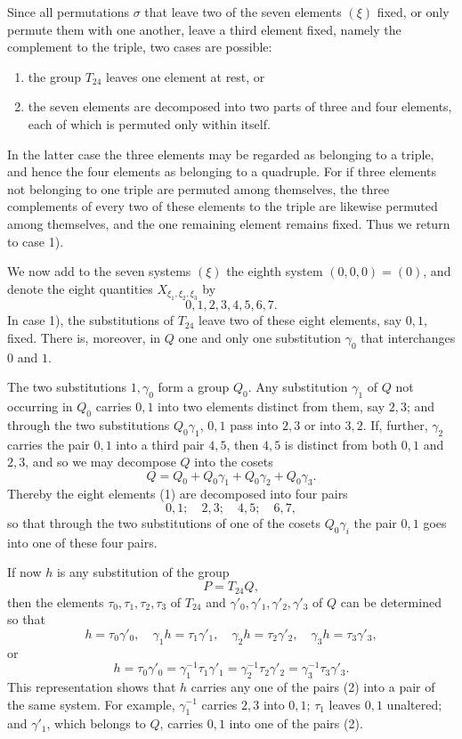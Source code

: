 \documentclass[11pt]{article}
\begin{document}
Since all permutations $\sigma$ that leave two of the seven elements $(\xi)$ fixed, or only permute them with one another, leave a third element fixed, namely the complement to the triple, two cases are possible:
\begin{enumerate}[label=\arabic*),leftmargin=2.8em]
\item the group $T_{24}$ leaves one element at rest, or
\item the seven elements are decomposed into two parts of three and four elements, each of which is permuted only within itself.
\end{enumerate}
In the latter case the three elements may be regarded as belonging to a triple, and hence the four elements as belonging to a quadruple. For if three elements not belonging to one triple are permuted among themselves, the three complements of every two of these elements to the triple are likewise permuted among themselves, and the one remaining element remains fixed. Thus we return to case 1).

We now add to the seven systems $(\xi)$ the eighth system $(0,0,0)=(0)$, and denote the eight quantities $X_{\xi_1,\xi_2,\xi_3}$ by
\begin{equation}
 0,1,2,3,4,5,6,7.
 \tag{1}
\end{equation}
In case 1), the substitutions of $T_{24}$ leave two of these eight elements, say $0,1$, fixed. There is, moreover, in $Q$ one and only one substitution $\gamma_0$ that interchanges $0$ and $1$.

The two substitutions $1,\gamma_0$ form a group $Q_0$. Any substitution $\gamma_1$ of $Q$ not occurring in $Q_0$ carries $0,1$ into two elements distinct from them, say $2,3$; and through the two substitutions $Q_0\gamma_1$, $0,1$ pass into $2,3$ or into $3,2$. If, further, $\gamma_2$ carries the pair $0,1$ into a third pair $4,5$, then $4,5$ is distinct from both $0,1$ and $2,3$, and so we may decompose $Q$ into the cosets
\[
 Q=Q_0+Q_0\gamma_1+Q_0\gamma_2+Q_0\gamma_3.
\]
Thereby the eight elements (1) are decomposed into four pairs
\begin{equation}
 0,1;\quad 2,3;\quad 4,5;\quad 6,7,
 \tag{2}
\end{equation}
so that through the two substitutions of one of the cosets $Q_0\gamma_i$ the pair $0,1$ goes into one of these four pairs.

If now $h$ is any substitution of the group
\[
 P=T_{24}Q,
\]
then the elements $\tau_0,\tau_1,\tau_2,\tau_3$ of $T_{24}$ and $\gamma'_0,\gamma'_1,\gamma'_2,\gamma'_3$ of $Q$ can be determined so that
\[
 h=\tau_0\gamma'_0,
 \quad \gamma_1h=\tau_1\gamma'_1,
 \quad \gamma_2h=\tau_2\gamma'_2,
 \quad \gamma_3h=\tau_3\gamma'_3,
\]
or
\[
 h=\tau_0\gamma'_0
 =\gamma_1^{-1}\tau_1\gamma'_1
 =\gamma_2^{-1}\tau_2\gamma'_2
 =\gamma_3^{-1}\tau_3\gamma'_3.
\]
This representation shows that $h$ carries any one of the pairs (2) into a pair of the same system. For example, $\gamma_1^{-1}$ carries $2,3$ into $0,1$; $\tau_1$ leaves $0,1$ unaltered; and $\gamma'_1$, which belongs to $Q$, carries $0,1$ into one of the pairs (2).
\end{document}
